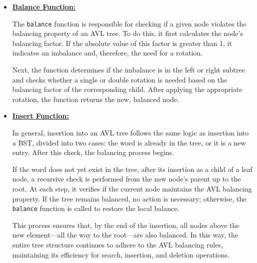 \begin{itemize}
\begin{itemize}
\begin{center}
    \end{center}

  \end{itemize}

  \item \underline{\textbf{Balance Function:}}

  The \texttt{balance} function is responsible for checking if a given node violates the balancing property of an AVL tree. To do this, it first calculates the node's balancing factor. If the absolute value of this factor is greater than 1, it indicates an imbalance and, therefore, the need for a rotation.

  Next, the function determines if the imbalance is in the left or right subtree and checks whether a single or double rotation is needed based on the balancing factor of the corresponding child. After applying the appropriate rotation, the function returns the new, balanced node.

  \item \underline{\textbf{Insert Function:}}

  In general, insertion into an AVL tree follows the same logic as insertion into a BST, divided into two cases: the word is already in the tree, or it is a new entry. After this check, the balancing process begins.

  If the word does not yet exist in the tree, after its insertion as a child of a leaf node, a recursive check is performed from the new node's parent up to the root. At each step, it verifies if the current node maintains the AVL balancing property. If the tree remains balanced, no action is necessary; otherwise, the \texttt{balance} function is called to restore the local balance.

  This process ensures that, by the end of the insertion, all nodes above the new element---all the way to the root---are also balanced. In this way, the entire tree structure continues to adhere to the AVL balancing rules, maintaining its efficiency for search, insertion, and deletion operations.

\end{itemize}













